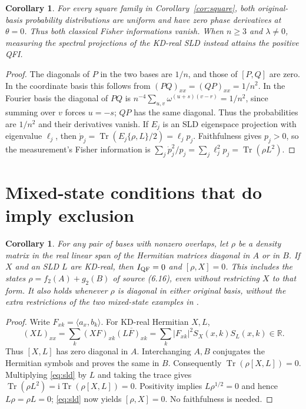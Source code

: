 \documentclass[11pt]{article}
\newcommand{\Tr}{\operatorname{Tr}}
\newcommand{\ii}{\mathrm{i}}
\newtheorem{corollary}[theorem]{Corollary}
\begin{document}
\begin{corollary}\label{cor:measurement}
For every square family in Corollary~\ref{cor:square}, both original-basis
probability distributions are uniform and have zero phase derivatives at
$\theta=0$. Thus both classical Fisher informations vanish. When $n\ge3$
and $\lambda\ne0$, measuring the spectral projections of the KD-real SLD
instead attains the positive QFI.
\end{corollary}
\begin{proof}
The diagonals of $P$ in the two bases are $1/n$, and those of
$[P,Q]$ are zero. In the coordinate basis this follows from
$(PQ)_{xx}=(QP)_{xx}=1/n^2$. In the Fourier basis the diagonal of $PQ$
is $n^{-4}\sum_{u,v}\omega^{(u+s)(v-r)}=1/n^2$, since summing over $v$
forces $u=-s$; $QP$ has the same diagonal. Thus the probabilities are
$1/n^2$ and their derivatives vanish. If $E_j$ is an SLD eigenspace
projection with eigenvalue $\ell_j$, then
$\dot p_j=\Tr(E_j\{\rho,L\}/2)=\ell_jp_j$.
Faithfulness gives $p_j>0$, so the measurement's Fisher information is
$\sum_j\dot p_j^2/p_j=\sum_j\ell_j^2p_j=\Tr(\rho L^2)$.
\end{proof}

\section{Mixed-state conditions that do imply exclusion}
\begin{corollary}\label{cor:diagonal}
For any pair of bases with nonzero overlaps, let $\rho$ be a density
matrix in the real linear span of the Hermitian matrices diagonal in
$A$ or in $B$. If $X$ and an SLD $L$ are KD-real, then
$I_{\rm QF}=0$ and $[\rho,X]=0$.
This includes the states $\rho=f_2(A)+g_2(B)$ of source (6.16), even without
restricting $X$ to that form. It also holds whenever $\rho$ is diagonal in either original
basis, without the extra restrictions of the two mixed-state examples in
\cite[\S6.3, pp.~44--45]{source}.
\end{corollary}
\begin{proof}
Write $F_{xk}=\langle a_x,b_k\rangle$. For KD-real Hermitian $X,L$,
\[
 (XL)_{xx}=\sum_k(XF)_{xk}\overline{(LF)_{xk}}
 =\sum_k|F_{xk}|^2S_X(x,k)S_L(x,k)\in\mathbb R.
\]
Thus $[X,L]$ has zero diagonal in $A$. Interchanging $A,B$ conjugates
the Hermitian symbols and proves the same in $B$. Consequently
$\Tr(\rho[X,L])=0$. Multiplying \eqref{eq:sld} by $L$ and taking the trace gives
$\Tr(\rho L^2)=\ii\Tr(\rho[X,L])=0$.
Positivity implies $L\rho^{1/2}=0$ and hence $L\rho=\rho L=0$;
\eqref{eq:sld} now yields $[\rho,X]=0$. No faithfulness is needed.
\end{proof}
\end{document}
